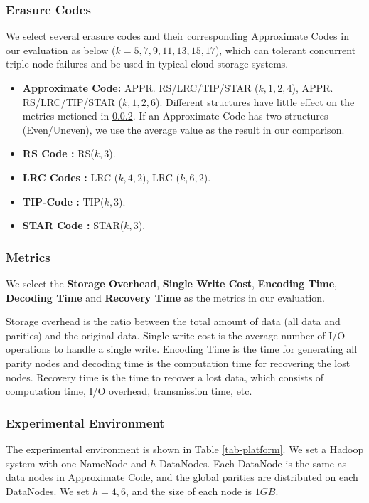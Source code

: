 \documentclass[sigconf]{acmart}
\begin{document}
\subsubsection{Erasure Codes}
We select several erasure codes and their corresponding Approximate Codes in our evaluation as below ($k = 5,7,9,11,13,15,17$), which can tolerant concurrent triple node failures and be used in typical cloud storage systems.
\begin{itemize}
    \item \textbf{Approximate Code:} APPR. RS/LRC/TIP/STAR ($k,1,2,4$), APPR. RS/LRC/TIP/STAR ($k,1,2,6$). Different structures have little effect on the metrics metioned in \ref{metrics}.
     If an Approximate Code has two structures (Even/Uneven), we use the average value as the result in our comparison.
    \item \textbf{RS Code \cite{RS}:} RS($k,3$).
    \item \textbf{LRC Codes \cite{LRC}:} LRC ($k,4,2$), LRC ($k,6,2$). 
    \item \textbf{TIP-Code \cite{TIP}:} TIP($k,3$). 
    \item \textbf{STAR Code \cite{STAR}:} STAR($k,3$).
\end{itemize}

\subsubsection{Metrics}\label{metrics}
We select the \textbf{Storage Overhead}, \textbf{Single Write Cost}, \textbf{Encoding Time}, \textbf{Decoding Time} and \textbf{Recovery Time} as the metrics in our evaluation.

Storage overhead is the ratio between the total amount of data (all data and parities) and the original data. Single write cost is the average number of I/O operations to handle a single write. Encoding Time is the time for generating all parity nodes and decoding time is the computation time for recovering the lost nodes. Recovery time is the time to recover a lost data, which consists of computation time, I/O overhead, transmission time, etc.

\subsubsection{Experimental Environment}
The experimental environment is shown in Table \ref{tab-platform}. We set a Hadoop system with one NameNode and $h$ DataNodes. Each DataNode is the same as data nodes in Approximate Code, and the global parities are distributed on each DataNodes. We set $h=4,6$, and the size of each node is $1GB$. 
\end{document}
